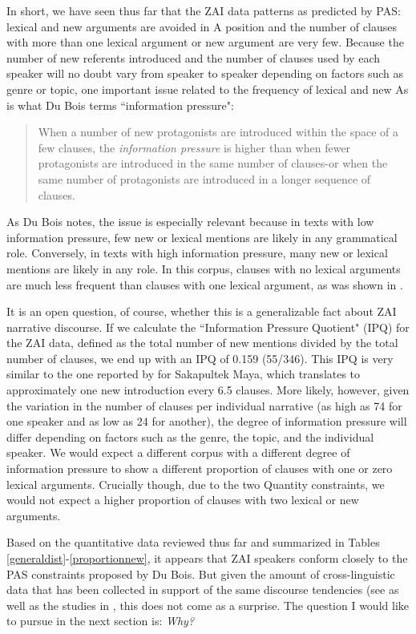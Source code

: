In short, we have seen thus far that the ZAI data patterns as predicted by PAS: lexical and new arguments are avoided in A position and the number of clauses with more than one lexical argument or new argument are very few. Because the number of new referents introduced and the number of clauses used by each speaker will no doubt vary from speaker to speaker depending on factors such as genre or topic, one important issue related to the frequency of lexical and new As is what Du Bois terms ``information pressure": 

\begin{quote}
When a number of new protagonists are introduced within the space of a few clauses, the \textit{information pressure} is higher than when fewer protagonists are introduced in the same number of clauses-or when the same number of protagonists are introduced in a longer sequence of clauses. \citep[834 (italics mine)]{dubois1987}
\end{quote}

As Du Bois notes, the issue is especially relevant because in texts with low information pressure, few new or lexical mentions are likely in any grammatical role. Conversely, in texts with high information pressure, many new or lexical mentions are likely in any role. In this corpus, clauses with no lexical arguments are much less frequent than clauses with one lexical argument, as was shown in .

It is an open question, of course, whether this is a generalizable fact about ZAI narrative discourse. If we calculate the ``Information Pressure Quotient" (IPQ) for the ZAI data, defined as the total number of new mentions divided by the total number of clauses, we end up with an IPQ of 0.159 (55/346). This IPQ is very similar to the one reported by \citet[834]{dubois1987} for Sakapultek Maya, which translates to approximately one new introduction every 6.5 clauses. More likely, however, given the variation in the number of clauses per individual narrative (as high as 74 for one speaker and as low as 24 for another), the degree of information pressure will differ depending on factors such as the genre, the topic, and the individual speaker. We would expect a different corpus with a different degree of information pressure to show a different proportion of clauses with one or zero lexical arguments. Crucially though, due to the two Quantity constraints, we would not expect a higher proportion of clauses with two lexical or new arguments.

Based on the quantitative data reviewed thus far and summarized in Tables \ref{generaldist}-\ref{proportionnew}, it appears that ZAI speakers conform closely to the PAS constraints proposed by Du Bois. But given the amount of cross-linguistic data that has been collected in support of the same discourse tendencies (see  as well as the studies in \citet{dubois2003}, this does not come as a surprise. The question I would like to pursue in the next section is: \textit{Why?}
 

